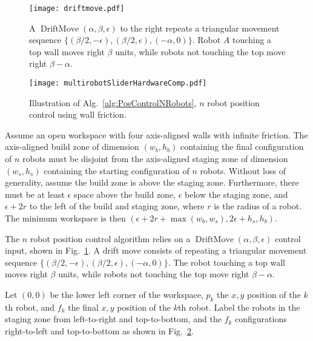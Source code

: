 \begin{figure}
\begin{center}
	\texttt{[image: driftmove.pdf]}
\end{center}
\vspace{-1em}
\caption{\label{fig:driftmove}
A  $\operatorname{DriftMove}(\alpha, \beta, \epsilon)$ to the right repeats a triangular movement sequence $\{ (\beta/2,-\epsilon),(\beta/2,\epsilon),(-\alpha,0)\}$. Robot $A$ touching a top wall moves right $\beta$ units, while robots not touching the top move right $\beta-\alpha$.
}
\end{figure}
\begin{figure}
\begin{center}
	\texttt{[image: multirobotSliderHardwareComp.pdf]}
\end{center}
\vspace{-1em}
\caption{\label{fig:construction2d}
Illustration of Alg.\ \ref{alg:PosControlNRobots}, $n$ robot position control  using wall friction.
}
\end{figure}


Assume an open workspace with four axis-aligned walls with infinite friction.
The axis-aligned build zone of dimension $(w_b, h_b)$ containing the final configuration of $n$ robots must be disjoint from the axis-aligned staging zone of dimension $(w_s, h_s)$  containing the starting configuration of $n$ robots. Without loss of generality, assume the build zone  is above the staging zone. 
Furthermore, there must be at least $\epsilon$ space above the build zone, $\epsilon$ below the staging zone, and $\epsilon + 2r$ to the left of the build and staging zone, where $r$ is the radius of a robot.  The minimum workspace is then $(\epsilon + 2r + \max(w_b,w_s), 2\epsilon + h_s,h_b)$.

The $n$ robot position control algorithm relies on a $\operatorname{DriftMove}(\alpha, \beta, \epsilon)$ control input, shown in Fig.\  \ref{fig:driftmove}.
A drift move consists of repeating a triangular movement sequence $\{ (\beta/2,-\epsilon),(\beta/2,\epsilon),(-\alpha,0)\}$. The robot touching a top wall moves right $\beta$ units, while robots not touching the top move right $\beta-\alpha$.

Let $(0,0)$ be the lower left corner of the workspace, $p_k$ the $x,y$ position of the $k$th robot, and $f_k$ the final $x,y$ position of the $k$th robot. Label the robots in the staging zone from left-to-right and top-to-bottom, and the $f_k$ configurations right-to-left and top-to-bottom as shown in Fig.~\ref{fig:construction2d}.


